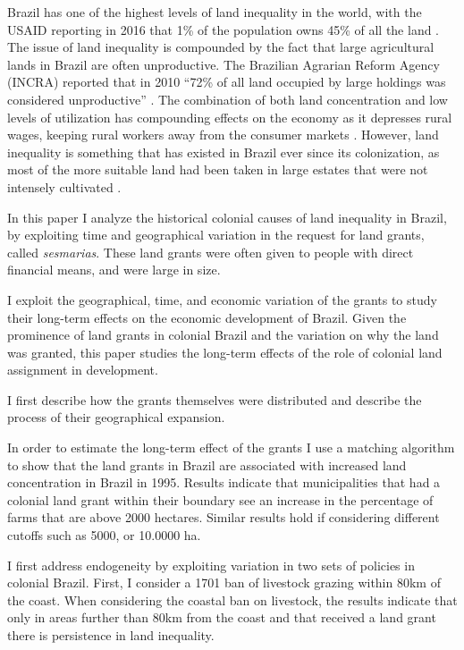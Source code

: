 \documentclass{article}
\begin{document}
Brazil has one of the highest levels of land inequality in the world, with the USAID reporting in 2016 that 1\% of the population owns 45\% of all the land \parencite{Usaid2016-xs}. 
The issue of land inequality is compounded by the fact that large agricultural lands in Brazil are often unproductive.
The Brazilian Agrarian Reform Agency (INCRA) reported that in 2010 ``72\% of all land occupied by large holdings was considered unproductive'' \parencite{Carlson2019-mk}.
The combination of both land concentration and low levels of utilization has compounding effects on the economy as it depresses rural wages, keeping rural workers away from the consumer markets \parencite[p.~1]{De_Oliveira_Andrade1980-xz}.
However, land inequality is something that has existed in Brazil ever since its colonization, as most of the more suitable land had been taken in large estates that were not intensely cultivated \parencite[p.~53]{Mueller1995-gi}. 

In this paper I analyze the historical colonial causes of land inequality in Brazil, by exploiting time and geographical variation in the request for land grants, called \textit{sesmarias}. 
These land grants were often given to people with direct financial means, and were large in size. 


I exploit the geographical, time, and economic variation of the grants to study their long-term effects on the economic development of Brazil.  
Given the prominence of land grants in colonial Brazil and the variation on why the land was granted, this paper studies the long-term effects of the role of colonial land assignment in development.  

I first describe how the grants themselves were distributed and describe the process of their geographical expansion.

In order to estimate the long-term effect of the grants I use a matching algorithm to show that the land grants in Brazil are associated with increased land concentration in Brazil in 1995. 
Results indicate that municipalities that had a colonial land grant within their boundary see an increase in the percentage of farms that are above 2000 hectares. Similar results hold if considering different cutoffs such as 5000, or 10.0000 ha. 

I first address endogeneity by exploiting variation in two sets of policies in colonial Brazil.
First, I consider a 1701 ban of livestock grazing within 80km of the coast.
When considering the coastal ban on livestock, the results indicate that only in areas further than 80km from the coast and that received a land grant there is persistence in land inequality.
\end{document}

